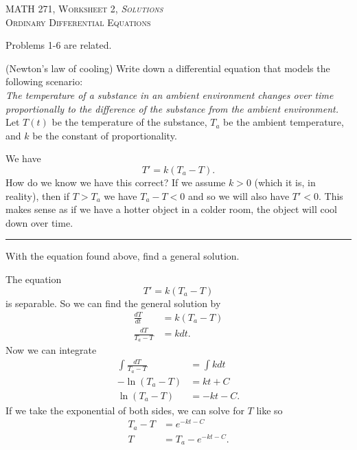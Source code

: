 \documentclass[12pt]{article} %
\begin{document}
\begin{center}
   \textsc{\large MATH 271, Worksheet 2, \emph{Solutions}}\\
   \textsc{Ordinary Differential Equations}
\end{center}
\vspace{.5cm}

\begin{center}
    Problems 1-6 are related.
\end{center}

\begin{problem}
    (Newton's law of cooling) Write down a differential equation that models the following scenario:\\
    
    \noindent\emph{The temperature of a substance in an ambient environment changes over time proportionally to the difference of the substance from the ambient environment.}\\
    
    \noindent Let $T(t)$ be the temperature of the substance, $T_a$ be the ambient temperature, and $k$ be the constant of proportionality.
\end{problem}
\begin{solution}
We have
\[
T'=k(T_a-T).
\]
How do we know we have this correct? If we assume $k>0$ (which it is, in reality), then if $T>T_a$ we have $T_a-T<0$ and so we will also have $T'<0$. This makes sense as if we have a hotter object in a colder room, the object will cool down over time.
\end{solution}

\hrule

\begin{problem}
    With the equation found above, find a general solution.
\end{problem}
\begin{solution}
The equation
\[
T'=k(T_a-T)
\]
is separable.  So we can find the general solution by
\begin{align*}
    \frac{dT}{dt}&=k(T_a-T)\\
    \frac{dT}{T_a-T}&=kdt.
\end{align*}
Now we can integrate
\begin{align*}
    \int\frac{dT}{T_a-T} &= \int kdt\\
    -\ln(T_a-T)&=kt+C\\
    \ln(T_a-T)&=-kt-C.
\end{align*}
If we take the exponential of both sides, we can solve for $T$ like so
\begin{align*}
    T_a-T&=e^{-kt-C}\\
    T&=T_a-e^{-kt-C}.
\end{align*}
\end{solution}
\end{document}
